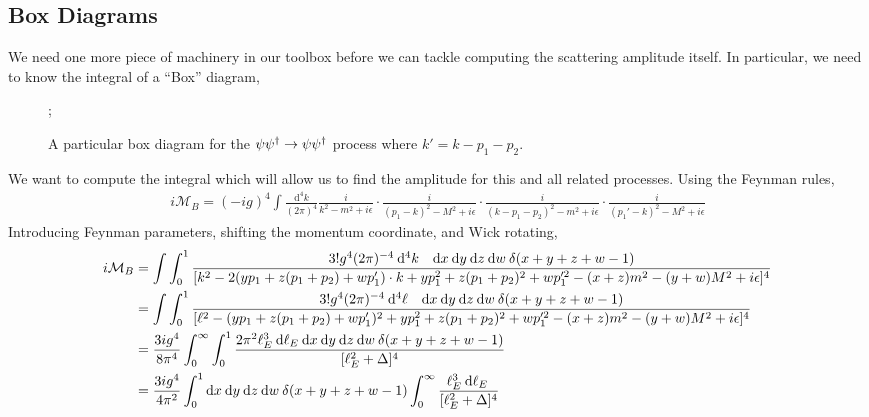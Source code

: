 \documentclass[12pt]{extarticle}
\begin{document}
\subsection{Box Diagrams}
We need one more piece of machinery in our toolbox before we can tackle computing the scattering amplitude itself. In particular, we need to know the integral of a ``Box'' diagram,
\begin{figure}
\begin{center}
;
\caption{A particular box diagram for the $\psi \psi^\dagger \to \psi \psi^\dagger$ process where $k' = k - p_1 - p_2$.}
\end{center}
\end{figure}
We want to compute the integral which will allow us to find the amplitude for this and all related processes. Using the Feynman rules,
\begin{align*}
i\mathcal{M}_B = (-ig)^4 \int \frac{\mathrm{d}^4 k}{(2 \pi)^4} \frac{i}{k^2 - m^2 + i \epsilon} \cdot \frac{i}{(p_1 - k)^2 - M^2 + i \epsilon} \cdot \frac{i}{(k - p_1 - p_2)^2 - m^2 + i \epsilon} \cdot \frac{i}{(p_1' - k)^2 - M^2 + i \epsilon} 
\end{align*}
Introducing Feynman parameters, shifting the momentum coordinate, and Wick rotating,
\begin{align*}
i\mathcal{M}_B & = \int \int_0^1 \frac{3! g^4 (2\pi)^{-4} \:\mathrm{d}^4 k\quad \mathrm{d}x \: \mathrm{d}y \: \mathrm{d}z \: \mathrm{d}w \: \delta(x + y + z + w - 1)}{[k^2 - 2( y p_1 + z (p_1 + p_2) +  w p_1')\cdot k + y p_1^2 + z (p_1 + p_2)^2 + w p_1'^2 - (x + z)m^2 - (y + w)M^2 + i \epsilon ]^4}
\\
& = \int \int_0^1 \frac{3! g^4 (2\pi)^{-4} \:\mathrm{d}^4 \ell \quad \mathrm{d}x \: \mathrm{d}y \: \mathrm{d}z \: \mathrm{d}w \: \delta(x + y + z + w - 1)}{[\ell^2 - (y p_1 + z (p_1 + p_2) + w p_1' )^2 + y p_1^2 + z (p_1 + p_2)^2 + w p_1'^2 - (x + z)m^2 - (y + w)M^2 + i \epsilon ]^4}
\\
& = \frac{3ig^4}{8 \pi^4} \int_{0}^\infty \int_0^1 \frac{2\pi^2 \ell_E^3 \: \mathrm{d}\ell_E \: \mathrm{d}x \: \mathrm{d}y \: \mathrm{d}z \: \mathrm{d}w \: \delta(x + y + z + w - 1)}{[\ell_E^2 + \Delta ]^4}
\\
& = \frac{3ig^4}{4 \pi^2} \int_0^1 \mathrm{d}x \: \mathrm{d}y \: \mathrm{d}z \: \mathrm{d}w \: \delta(x + y + z + w - 1) \int_{0}^\infty \frac{ \ell_E^3 \: \mathrm{d}\ell_E \:}{[\ell_E^2 + \Delta ]^4}
\end{align*}
\end{document}

